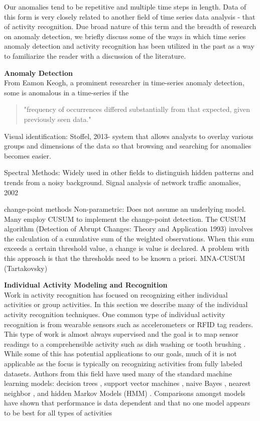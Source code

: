 Our anomalies tend to be repetitive and multiple time steps in length.  Data of this form is very closely related to another field of time series data analysis - that of activity recognition.   Due broad nature of this term and the breadth of research on anomaly detection, we briefly discuss some of the ways in which time series anomaly detection and activity recognition has been utilized in the past as a way to familiarize the reader with a discussion of the literature.

\bigskip
\noindent \textbf{Anomaly Detection} \\
From Eamon Keogh, a prominent researcher in time-series anomaly detection, some is anomalous in a time-series if the 

\begin{quote}
"frequency of occurrences differed substantially from that expected, given previously seen data."
\end{quote}


Visual identification:
Stoffel, 2013- system that allows analysts to overlay various groups and dimensions of the data so that browsing and searching for anomalies becomes easier.

Spectral Methods:
Widely used in other fields to distinguish hidden patterns and trends from a noisy background.
Signal analysis of network traffic anomalies, 2002


change-point methods
Non-parametric: Does not assume an underlying model.  Many employ CUSUM to implement the change-point detection.  The CUSUM algorithm (Detection of Abrupt Changes: Theory and Application 1993) involves the calculation of a cumulative sum of the weighted observations.  When this sum exceeds a certain threshold value, a change is value is declared.  A problem with this approach is that the thresholds need to be known a priori.
MNA-CUSUM (Tartakovsky)


\bigskip
\noindent \textbf{Individual Activity Modeling and Recognition} \\
Work in activity recognition has focused on recognizing either individual activities or group activities.  In this section we describe many of the individual activity recognition techniques.  One common type of individual activity recognition is from wearable sensors such as accelerometers or RFID tag readers.  This type of work is almost always supervised and the goal is to map sensor readings to a comprehensible activity such as dish washing or tooth brushing \cite{Wang2009,Bao2004}.  While some of this has potential applications to our goals, much of it is not applicable as the focus is typically on recognizing activities from fully labeled datasets.  Authors from this field have used many of the standard machine learning models: decision trees \cite{Bao2004}, support vector machines \cite{Krishnan2008,Bao2004,Lustrek2009}, naive Bayes \cite{Bao2004,Lustrek2009}, nearest neighbor \cite{Bao2004,Lustrek2009}, and hidden Markov Models (HMM) \cite{Wang2009,Oliver2002}.  Comparisons amongst models have shown that performance is data dependent and that no one model appears to be best for all types of activities \cite{Bao2004,Lustrek2009}

